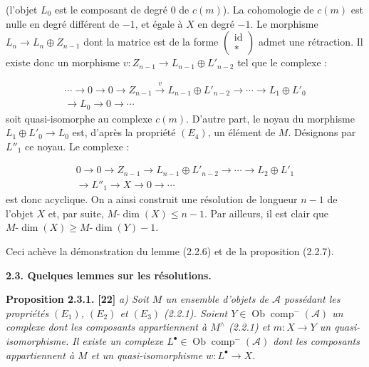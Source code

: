 \clearpage
{}%
\begingroup\small\setlength{\parskip}{0pt}\setlength{\emergencystretch}{1.5em}
\setlength{\abovedisplayskip}{4pt plus 2pt minus 2pt}%
\setlength{\belowdisplayskip}{4pt plus 2pt minus 2pt}%

(l'objet $L_0$ est le composant de degré $0$ de $c(m)$). La cohomologie de
$c(m)$ est nulle en degré différent de $-1$, et égale à $X$ en degré
$-1$. Le morphisme $L_n\longrightarrow L_n\oplus Z_{n-1}$ dont la
matrice est de la forme
$\begin{pmatrix}\operatorname{id}\\ *\end{pmatrix}$ admet une rétraction.
Il existe donc un morphisme
$v\colon Z_{n-1}\longrightarrow L_{n-1}\oplus L'_{n-2}$ tel que le
complexe :

\[
\begin{aligned}
\cdots\longrightarrow0\longrightarrow0\longrightarrow Z_{n-1}
\xrightarrow{v}L_{n-1}\oplus L'_{n-2}\longrightarrow\cdots
\longrightarrow L_1\oplus L'_0\\
\longrightarrow L_0\longrightarrow0\longrightarrow\cdots
\end{aligned}
\]
soit quasi-isomorphe au complexe $c(m)$. D'autre part, le noyau du
morphisme $L_1\oplus L'_0\longrightarrow L_0$ est, d'après la propriété
$(E_4)$, un élément de $M$. Désignons par $L''_1$ ce noyau. Le complexe :

\[
\begin{aligned}
0\longrightarrow0\longrightarrow Z_{n-1}
\longrightarrow L_{n-1}\oplus L'_{n-2}\longrightarrow\cdots
\longrightarrow L_2\oplus L'_1\\
\longrightarrow L''_1\longrightarrow X\longrightarrow0\longrightarrow\cdots
\end{aligned}
\]
est donc acyclique. On a ainsi construit une résolution de longueur $n-1$
de l'objet $X$ et, par suite, $M\text{-}\dim(X)\leq n-1$. Par ailleurs,
il est clair que $M\text{-}\dim(X)\geq M\text{-}\dim(Y)-1$.

Ceci achève la démonstration du lemme (2.2.6) et de la proposition (2.2.7).

\medskip\noindent\textbf{2.3. Quelques lemmes sur les résolutions.}

\medskip\noindent\textbf{Proposition 2.3.1.} \textbf{[22]}\quad
\textit{a) Soit $M$ un ensemble d'objets de $\mathcal A$ possédant les
propriétés $(E_1)$, $(E_2)$ et $(E_3)$ (2.2.1). Soient
$Y\in\operatorname{Ob}\operatorname{comp}^{-}(\mathcal A)$ un complexe
dont les composants appartiennent à $M^\wedge$ (2.2.1) et
$m\colon X\longrightarrow Y$ un quasi-isomorphisme. Il existe un complexe
$L^\bullet\in\operatorname{Ob}\operatorname{comp}^{-}(\mathcal A)$ dont
les composants appartiennent à $M$ et un quasi-isomorphisme
$w\colon L^\bullet\longrightarrow X$.}

